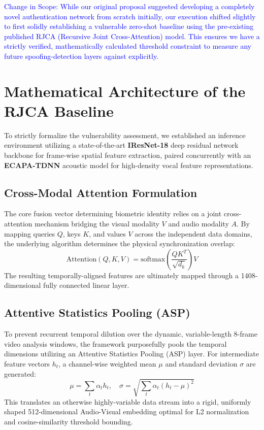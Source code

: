 \documentclass[conference]{IEEEtran}
\begin{document}
\textcolor{blue}{Change in Scope: While our original proposal suggested developing a completely novel authentication network from scratch initially, our execution shifted slightly to first solidly establishing a vulnerable zero-shot baseline using the pre-existing published RJCA (Recursive Joint Cross-Attention) model. This ensures we have a strictly verified, mathematically calculated threshold constraint to measure any future spoofing-detection layers against explicitly.}


\section{Mathematical Architecture of the RJCA Baseline}
To strictly formalize the vulnerability assessment, we established an inference environment utilizing a state-of-the-art \textbf{IResNet-18} deep residual network backbone for frame-wise spatial feature extraction, paired concurrently with an \textbf{ECAPA-TDNN} acoustic model for high-density vocal feature representations.

\subsection{Cross-Modal Attention Formulation}
The core fusion vector determining biometric identity relies on a joint cross-attention mechanism bridging the visual modality $V$ and audio modality $A$. By mapping queries $Q$, keys $K$, and values $V$ across the independent data domains, the underlying algorithm determines the physical synchronization overlap:
\begin{equation}
    \text{Attention}(Q, K, V) = \text{softmax}\left(\frac{QK^T}{\sqrt{d_k}}\right)V
\end{equation}
The resulting temporally-aligned features are ultimately mapped through a 1408-dimensional fully connected linear layer.

\subsection{Attentive Statistics Pooling (ASP)}
To prevent recurrent temporal dilution over the dynamic, variable-length $8$-frame video analysis windows, the framework purposefully pools the temporal dimensions utilizing an Attentive Statistics Pooling (ASP) layer. For intermediate feature vectors $h_t$, a channel-wise weighted mean $\mu$ and standard deviation $\sigma$ are generated:
\begin{equation}
    \mu = \sum_{t} \alpha_t h_t, \quad \sigma = \sqrt{\sum_{t} \alpha_t (h_t - \mu)^2}
\end{equation}
This translates an otherwise highly-variable data stream into a rigid, uniformly shaped 512-dimensional Audio-Visual embedding optimal for L2 normalization and cosine-similarity threshold bounding.
\end{document}

